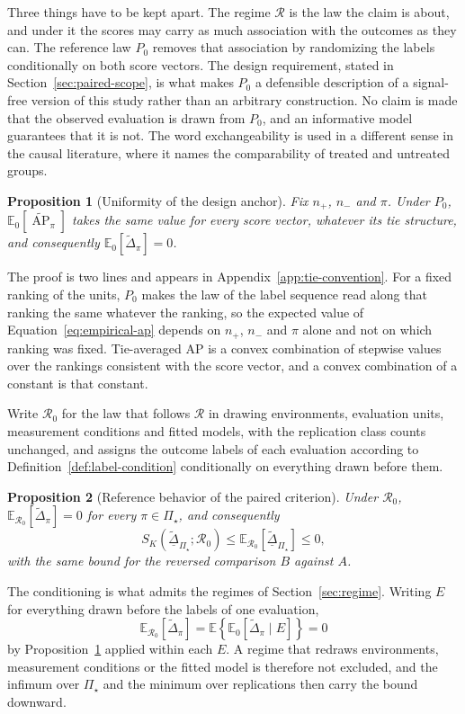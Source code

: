 \documentclass[11pt]{article}
\newcommand{\AP}{\operatorname{AP}}
\newcommand{\Regime}{\mathcal{R}}
\newcommand{\PSet}{\Pi_\star}
\newcommand{\E}{\mathbb{E}}
\newcommand{\APta}{\widetilde{\AP}}
\newcommand{\Dta}{\widetilde{\Delta}}
\newcommand{\RobDta}{\underline{\widetilde{\Delta}}_{\PSet}}
\newtheorem{proposition}{Proposition}
\theoremstyle{remark}
\begin{document}
Three things have to be kept apart. The regime $\Regime$ is the law the claim is about, and under it the scores may carry as much association with the outcomes as they can. The reference law $P_0$ removes that association by randomizing the labels conditionally on both score vectors. The design requirement, stated in Section~\ref{sec:paired-scope}, is what makes $P_0$ a defensible description of a signal-free version of this study rather than an arbitrary construction. No claim is made that the observed evaluation is drawn from $P_0$, and an informative model guarantees that it is not. The word exchangeability is used in a different sense in the causal literature, where it names the comparability of treated and untreated groups.

\begin{proposition}[Uniformity of the design anchor]
\label{prop:uniformity}
Fix $n_+$, $n_-$ and $\pi$. Under $P_0$, $\E_0[\APta_\pi]$ takes the same value for every score vector, whatever its tie structure, and consequently $\E_0[\Dta_\pi]=0$.
\end{proposition}

The proof is two lines and appears in Appendix~\ref{app:tie-convention}. For a fixed ranking of the units, $P_0$ makes the law of the label sequence read along that ranking the same whatever the ranking, so the expected value of Equation~\eqref{eq:empirical-ap} depends on $n_+$, $n_-$ and $\pi$ alone and not on which ranking was fixed. Tie-averaged AP is a convex combination of stepwise values over the rankings consistent with the score vector, and a convex combination of a constant is that constant.

Write $\Regime_0$ for the law that follows $\Regime$ in drawing environments, evaluation units, measurement conditions and fitted models, with the replication class counts unchanged, and assigns the outcome labels of each evaluation according to Definition~\ref{def:label-condition} conditionally on everything drawn before them.

\begin{proposition}[Reference behavior of the paired criterion]
\label{prop:conservative}
Under $\Regime_0$, $\E_{\Regime_0}[\Dta_\pi]=0$ for every $\pi\in\PSet$, and consequently
\[
S_K(\RobDta;\Regime_0)
\leq
\E_{\Regime_0}[\RobDta]
\leq
0 ,
\]
with the same bound for the reversed comparison $B$ against $A$.
\end{proposition}

The conditioning is what admits the regimes of Section~\ref{sec:regime}. Writing $E$ for everything drawn before the labels of one evaluation,
\[
\E_{\Regime_0}\left[\Dta_\pi\right]
=
\E\left\{
\E_0\left[\Dta_\pi\mid E\right]
\right\}
=
0
\]
by Proposition~\ref{prop:uniformity} applied within each $E$. A regime that redraws environments, measurement conditions or the fitted model is therefore not excluded, and the infimum over $\PSet$ and the minimum over replications then carry the bound downward.
\end{document}
